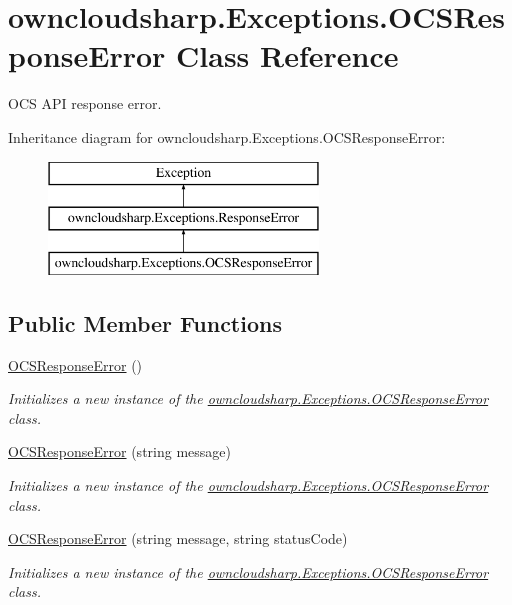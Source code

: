 \hypertarget{classowncloudsharp_1_1_exceptions_1_1_o_c_s_response_error}{}\section{owncloudsharp.\+Exceptions.\+O\+C\+S\+Response\+Error Class Reference}
\label{classowncloudsharp_1_1_exceptions_1_1_o_c_s_response_error}


O\+CS A\+PI response error.  


Inheritance diagram for owncloudsharp.\+Exceptions.\+O\+C\+S\+Response\+Error\+:\begin{figure}[H]
\begin{center}
\leavevmode
\includegraphics[height=3.000000cm]{classowncloudsharp_1_1_exceptions_1_1_o_c_s_response_error}
\end{center}
\end{figure}
\subsection*{Public Member Functions}
\begin{DoxyCompactItemize}
\item 
\hyperlink{classowncloudsharp_1_1_exceptions_1_1_o_c_s_response_error_a4a8be342eabdb1ff56309de41bb27376}{O\+C\+S\+Response\+Error} ()
\begin{DoxyCompactList}\small\item\em Initializes a new instance of the \hyperlink{classowncloudsharp_1_1_exceptions_1_1_o_c_s_response_error}{owncloudsharp.\+Exceptions.\+O\+C\+S\+Response\+Error} class. \end{DoxyCompactList}\item 
\hyperlink{classowncloudsharp_1_1_exceptions_1_1_o_c_s_response_error_abe1faed2e2f100a1d5e5c051413be70a}{O\+C\+S\+Response\+Error} (string message)
\begin{DoxyCompactList}\small\item\em Initializes a new instance of the \hyperlink{classowncloudsharp_1_1_exceptions_1_1_o_c_s_response_error}{owncloudsharp.\+Exceptions.\+O\+C\+S\+Response\+Error} class. \end{DoxyCompactList}\item 
\hyperlink{classowncloudsharp_1_1_exceptions_1_1_o_c_s_response_error_a140bbc4910589e73d076ba7a977b9e88}{O\+C\+S\+Response\+Error} (string message, string status\+Code)
\begin{DoxyCompactList}\small\item\em Initializes a new instance of the \hyperlink{classowncloudsharp_1_1_exceptions_1_1_o_c_s_response_error}{owncloudsharp.\+Exceptions.\+O\+C\+S\+Response\+Error} class. \end{DoxyCompactList}\end{DoxyCompactItemize}
